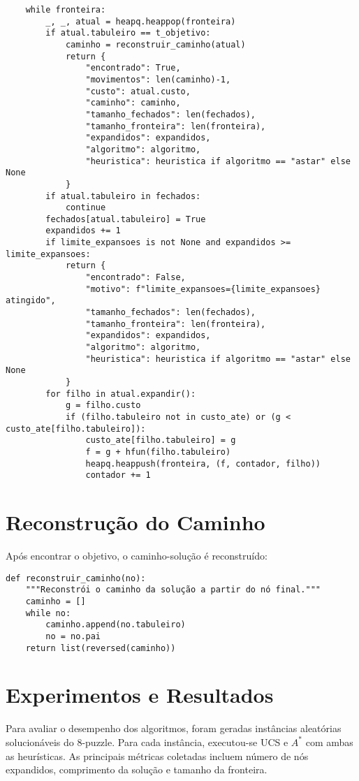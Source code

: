 \begin{verbatim}
    while fronteira:  
        _, _, atual = heapq.heappop(fronteira)  
        if atual.tabuleiro == t_objetivo:  
            caminho = reconstruir_caminho(atual)  
            return {  
                "encontrado": True,  
                "movimentos": len(caminho)-1,  
                "custo": atual.custo,  
                "caminho": caminho,  
                "tamanho_fechados": len(fechados),  
                "tamanho_fronteira": len(fronteira),  
                "expandidos": expandidos,  
                "algoritmo": algoritmo,  
                "heuristica": heuristica if algoritmo == "astar" else None  
            }  
        if atual.tabuleiro in fechados:  
            continue  
        fechados[atual.tabuleiro] = True  
        expandidos += 1  
        if limite_expansoes is not None and expandidos >= limite_expansoes:  
            return {  
                "encontrado": False,  
                "motivo": f"limite_expansoes={limite_expansoes} atingido",  
                "tamanho_fechados": len(fechados),  
                "tamanho_fronteira": len(fronteira),  
                "expandidos": expandidos,  
                "algoritmo": algoritmo,  
                "heuristica": heuristica if algoritmo == "astar" else None  
            }  
        for filho in atual.expandir():  
            g = filho.custo  
            if (filho.tabuleiro not in custo_ate) or (g < custo_ate[filho.tabuleiro]):  
                custo_ate[filho.tabuleiro] = g  
                f = g + hfun(filho.tabuleiro)  
                heapq.heappush(fronteira, (f, contador, filho))  
                contador += 1  
\end{verbatim}  

\section{Reconstrução do Caminho}  
Após encontrar o objetivo, o caminho-solução é reconstruído:  

\begin{verbatim}  
def reconstruir_caminho(no):  
    """Reconstrói o caminho da solução a partir do nó final."""  
    caminho = []  
    while no:  
        caminho.append(no.tabuleiro)  
        no = no.pai  
    return list(reversed(caminho))  
\end{verbatim}  

\section{Experimentos e Resultados}  
Para avaliar o desempenho dos algoritmos, foram geradas instâncias aleatórias solucionáveis do 8-puzzle. Para cada instância, executou-se UCS e $A^*$ com ambas as heurísticas. As principais métricas coletadas incluem número de nós expandidos, comprimento da solução e tamanho da fronteira.  

